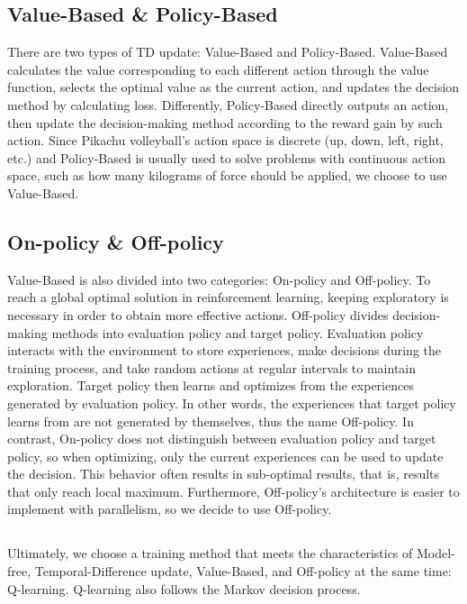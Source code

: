 \documentclass[sigconf]{acmart}
\begin{document}
\subsection{Value-Based \& Policy-Based}
There are two types of TD update: Value-Based and Policy-Based. Value-Based calculates the value corresponding to each different action through the value function, selects the optimal value as the current action, and updates the decision method by calculating loss. Differently, Policy-Based directly outputs an action, then update the decision-making method according to the reward gain by such action. Since Pikachu volleyball’s action space is discrete (up, down, left, right, etc.) and Policy-Based is usually used to solve problems with continuous action space, such as how many kilograms of force should be applied, we choose to use Value-Based.

\subsection{On-policy \& Off-policy}
Value-Based is also divided into two categories: On-policy and Off-policy. To reach a global optimal solution in reinforcement learning, keeping exploratory is necessary in order to obtain more effective actions. Off-policy divides decision-making methods into evaluation policy and target policy. Evaluation policy interacts with the environment to store experiences, make decisions during the training process, and take random actions at regular intervals to maintain exploration. Target policy then learns and optimizes from the experiences generated by evaluation policy. In other words, the experiences that target policy learns from are not generated by themselves, thus the name Off-policy. In contrast, On-policy does not distinguish between evaluation policy and target policy, so when optimizing, only the current experiences can be used to update the decision. This behavior often results in sub-optimal results, that is, results that only reach local maximum. Furthermore, Off-policy’s architecture is easier to implement with parallelism, so we decide to use Off-policy.

\subsection*{}
Ultimately, we choose a training method that meets the characteristics of Model-free, Temporal-Difference update, Value-Based, and Off-policy at the same time: Q-learning. Q-learning also follows the Markov decision process.
\end{document}
